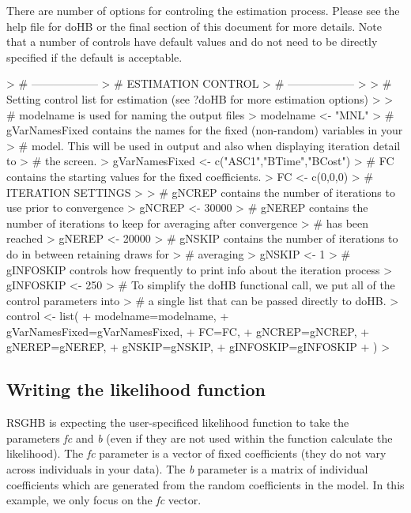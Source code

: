 \documentclass{article}
\begin{document}
There are number of options for controling the estimation process. Please see the help file for doHB or the final section of this document for more details. Note that a number of controls have default values and do not need to be directly specified if the default is acceptable.

\begin{Schunk}
\begin{Sinput}
> # ------------------
> # ESTIMATION CONTROL
> # ------------------
> 
> # Setting control list for estimation (see ?doHB for more estimation options)
> 
> # modelname is used for naming the output files
> modelname <- "MNL"          
> # gVarNamesFixed contains the names for the fixed (non-random) variables in your 
> # model. This will be used in output and also when displaying iteration detail to 
> # the screen.
> gVarNamesFixed <- c("ASC1","BTime","BCost")
> # FC contains the starting values for the fixed coefficients.
> FC <- c(0,0,0)                 
> # ITERATION SETTINGS
> 
> # gNCREP contains the number of iterations to use prior to convergence
> gNCREP    <- 30000
> # gNEREP contains the number of iterations to keep for averaging after convergence 
> # has been reached
> gNEREP    <- 20000 	       
> # gNSKIP contains the number of iterations to do in between retaining draws for 
> # averaging
> gNSKIP    <- 1		       
> # gINFOSKIP controls how frequently to print info about the iteration process
> gINFOSKIP <- 250           
> # To simplify the doHB functional call, we put all of the control parameters into 
> # a single list that can be passed directly to doHB.
> control <- list(
+      modelname=modelname,
+      gVarNamesFixed=gVarNamesFixed,
+      FC=FC,
+      gNCREP=gNCREP,
+      gNEREP=gNEREP,
+      gNSKIP=gNSKIP,
+      gINFOSKIP=gINFOSKIP
+ )
> 
\end{Sinput}
\end{Schunk}

\subsection*{Writing the likelihood function}

RSGHB is expecting the user-specificed likelihood function to take the parameters \emph{fc} and \emph{b} (even if they are not used within the function calculate the likelihood). The \emph{fc} parameter is a vector of fixed coefficients (they do not vary across individuals in your data). The \emph{b} parameter is a matrix of individual coefficients which are generated from the random coefficients in the model. In this example, we only focus on the \emph{fc} vector.
\end{document}

